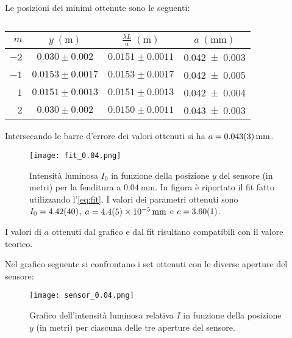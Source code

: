 \documentclass[../main.tex]{subfiles}
\begin{document}
Le posizioni dei minimi ottenute sono le seguenti:

\begin{table}[ht!]
    \centering
    \caption{}
    \begin{tabular}{r|cc|c}
        \toprule
        $m$  & $y \; (\si{\metre})$ & $\frac{\lambda L}{a} \; (\si{\metre})$ & $a \; (\si{\mm})$ \\
        \midrule
        $-2$ & $0.030 \pm 0.002$ & $0.0151 \pm 0.0011$ & \num{0.042+-0.003} \\
        $-1$ & $0.0153 \pm 0.0017$ & $0.0153 \pm 0.0017$ & \num{0.042+-0.005} \\
        $1$  & $0.0151 \pm 0.0013$ & $0.0151 \pm 0.0013$ & \num{0.042+-0.004} \\
        $2$  & $0.030 \pm 0.002$ & $0.0150 \pm 0.0011$ & \num{0.043+-0.003} \\
        \bottomrule
    \end{tabular}
    \label{tab:minimi 0.04}
\end{table}

Intersecando le barre d'errore dei valori ottenuti si ha $a = \qty{0.043+-0.003}{\mm}$.



\begin{figure}[ht!]
    \centering
    \texttt{[image: fit\_0.04.png]}
    \caption{Intensità luminosa $I_{0}$ in funzione della posizione $y$ del sensore (in metri) per la fenditura a $\qty{0.04}{\mm}$. In figura è riportato il fit fatto utilizzando l'\autoref{eq:fit}. I valori dei parametri ottenuti sono $I_{0} = \num{4.42+-0.4}$, $a = \qty{4.4+-0.5e-5}{\mm}$ e $c = \num{3.60+-0.01}$. }
    \label{fig:fit 0.04}
\end{figure}

I valori di $a$ ottenuti dal grafico e dal fit risultano compatibili con il valore teorico.

Nel grafico seguente si confrontano i set ottenuti con le diverse aperture del sensore:

\begin{figure}[ht!]
    \centering
    \texttt{[image: sensor\_0.04.png]}
    \caption{Grafico dell'intensità luminosa relativa $I$ in funzione della posizione $y$ (in metri) per ciascuna delle tre aperture del sensore.} %
    \label{fig:sensore 0.04}
\end{figure}
\end{document}
